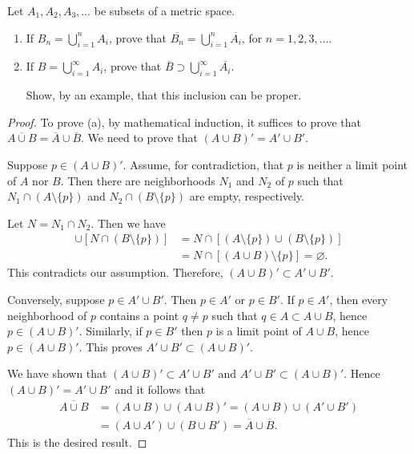 \begin{exercise}
Let $A_1, A_2, A_3, \ldots$ be subsets of a metric space.
\begin{enumerate}
    \item[(a)] If $B_n = \bigcup_{i=1}^nA_i$, prove that $\overline{B_n} = \bigcup_{i=1}^n \overline{A_i}$, for $n= 1, 2, 3, \ldots$.
    \item[(b)] If $B= \bigcup_{i=1}^{\infty} A_i$, prove that $\overline{B} \supset \bigcup_{i=1}^{\infty}\overline{A_i}$.

Show, by an example, that this inclusion can be proper.
\end{enumerate}
\end{exercise}
\begin{proof}
To prove (a), by mathematical induction, it suffices to prove that $\overline{A \cup B} = \overline{A} \cup \overline{B}$. 
We need to prove that $(A \cup B)'=A' \cup B'$.

Suppose $p \in (A \cup B)'$. 
Assume, for contradiction, that $p$ is neither a limit point of $A$ nor $B$.
Then there are neighborhoods $N_1$ and $N_2$ of $p$ such that $N_1 \cap (A \setminus \{p\})$ and $N_2 \cap (B \setminus \{p\})$ are empty, respectively.

Let $N = N_1 \cap N_2$.
Then we have
\begin{align*}
    [N \cap (A \setminus \{p\})] \cup [N \cap (B \setminus \{p\})] &= N \cap [(A \setminus \{p\}) \cup (B \setminus \{p\})] \\
    &=N \cap [(A \cup B) \setminus \{p\}] = \varnothing.
\end{align*}
This contradicts our assumption. Therefore, $(A \cup B)' \subset A' \cup B'$.

Conversely, suppose $p \in A' \cup B'$.
Then $p \in A'$ or $p \in B'$.
If $p \in A'$, then every neighborhood of $p$ contains a point $q \neq p$ such that $q \in A \subset A \cup B$, hence $p \in (A \cup B)'$.
Similarly, if $p \in B'$ then $p$ is a limit point of $A \cup B$, hence $p \in (A \cup B)'$. 
This proves $A' \cup B' \subset (A \cup B)'$.

We have shown that $(A \cup B)' \subset A' \cup B'$ and $A' \cup B' \subset (A \cup B)'$. 
Hence $(A \cup B)'=A' \cup B'$ and it follows that 
\begin{align*}
    \overline{A \cup B}&=(A \cup B) \cup (A \cup B)'=(A \cup B) \cup (A' \cup B')\\
    &=(A \cup A') \cup (B \cup B') = \overline{A} \cup \overline{B}.
\end{align*}
This is the desired result.


\end{proof}
